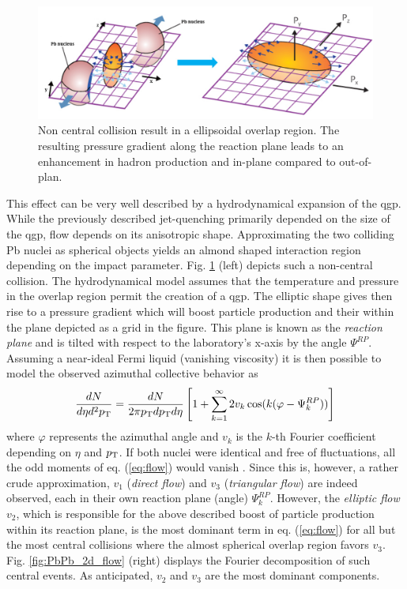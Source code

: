 \begin{figure}
  \centering
  \includegraphics[width=\textwidth]{figures/flow.png}
  \caption[Non central collision result in a ellipsoidal overlap region.]{Non central collision result in a ellipsoidal overlap region. The resulting pressure gradient along the reaction plane leads to an enhancement in hadron production and \pt in-plane compared to out-of-plan.}
  \label{fig:flow_scheme}
\end{figure}


This effect can be very well described by a hydrodynamical expansion of the \gls{qgp}. While the previously described jet-quenching primarily depended on the size of the \gls{qgp}, flow depends on its anisotropic shape. Approximating the two colliding Pb nuclei as spherical objects yields an almond shaped interaction region depending on the impact parameter. Fig. \ref{fig:flow_scheme} (left) depicts such a non-central collision. The hydrodynamical model assumes that the temperature and pressure in the overlap region permit the creation of a \gls{qgp}. The elliptic shape gives then rise to a pressure gradient which will boost particle production and their \pt within the plane depicted as a grid in the figure. This plane is known as the \emph{reaction plane} and is tilted with respect to the laboratory's x-axis by the angle $\Psi^{RP}$.  Assuming a near-ideal Fermi liquid (vanishing viscosity) it is then possible to model the observed azimuthal collective behavior as \cite{Wojciech2010}
\begin{equation}
  \label{eq:flow}
  \frac{dN}{d\eta d^2p_{\text{T}}} = 
  \frac{dN}{2\pi p_{\text{T}} dp_{\text{T}} d\eta} 
  \left[ 1+ \sum_{k=1}^{\infty}2v_k \cos (k(\varphi - \Psi_{k}^{RP})) \right ]
\end{equation}
where $\varphi$ represents the azimuthal angle and $v_k$ is the $k$-th Fourier coefficient depending on $\eta$ and $p_{\text{T}}$. If both nuclei were identical and free of fluctuations, all the odd moments of eq. (\ref{eq:flow}) would vanish \cite{Bozek2010}. Since this is, however, a rather crude approximation, $v_1$ (\emph{direct flow}) and $v_3$ (\emph{triangular flow}) are indeed observed, each in their own reaction plane (angle) $\Psi_k^{RP}$.  However, the \emph{elliptic flow}  $v_2$, which is responsible for the above described boost of particle production within its reaction plane, is the most dominant term in eq. (\ref{eq:flow}) for all but the most central collisions where the almost spherical overlap region favors $v_3$. Fig. \ref{fig:PbPb_2d_flow} (right) displays the Fourier decomposition of such central events. As anticipated, $v_2$ and $v_3$ are the most dominant components.\\

